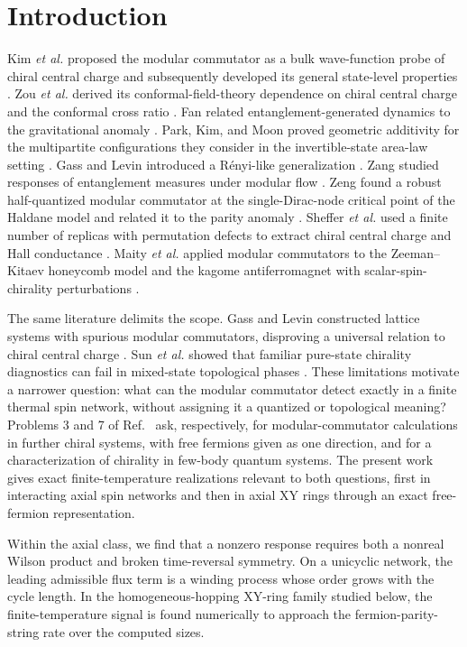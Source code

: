 \documentclass[aps,prb,preprint,nofootinbib,longbibliography]{revtex4-2}
\begin{document}
\section{Introduction}
\label{sec:introduction}

Kim \textit{et al.} proposed the modular commutator as a bulk wave-function
probe of chiral central charge \cite{KimEtAl2022PRL} and subsequently
developed its general state-level properties \cite{KimEtAl2022PRB}.  Zou
\textit{et al.} derived its conformal-field-theory dependence on chiral
central charge and the conformal cross ratio \cite{ZouEtAl2022}.  Fan related
entanglement-generated dynamics to the gravitational anomaly
\cite{Fan2022}.  Park, Kim, and Moon proved geometric additivity for the
multipartite configurations they consider in the invertible-state area-law
setting \cite{ParkEtAl2025}.  Gass and Levin introduced
a R\'enyi-like generalization \cite{GassLevin2026}.  Zang studied responses of
entanglement measures under modular flow \cite{Zang2026}.  Zeng found a
robust half-quantized modular commutator at the single-Dirac-node critical
point of the Haldane model and related it to the parity anomaly
\cite{Zeng2026}.  Sheffer
\textit{et al.} used a finite number of replicas with permutation defects to
extract chiral central charge and Hall conductance \cite{ShefferEtAl2026}.
Maity \textit{et al.} applied modular commutators to the Zeeman--Kitaev
honeycomb model and the kagome antiferromagnet with scalar-spin-chirality
perturbations \cite{MaityEtAl2025}.

The same literature delimits the scope.  Gass and Levin constructed lattice
systems with spurious modular commutators, disproving a universal relation to
chiral central charge \cite{GassLevin2024}.  Sun \textit{et al.} showed that
familiar pure-state chirality diagnostics can fail in mixed-state topological
phases \cite{SunEtAl2026}.  These limitations motivate a
narrower question: what can the modular commutator detect exactly in a finite
thermal spin network, without assigning it a quantized or topological
meaning?  Problems 3 and 7 of Ref.~\cite{KimEtAl2022PRB} ask, respectively,
for modular-commutator calculations in further chiral systems, with free
fermions given as one direction, and for a characterization of chirality in
few-body quantum systems.  The present work gives exact finite-temperature
realizations relevant to both questions, first in interacting axial spin
networks and then in axial XY rings through an exact free-fermion
representation.

Within the axial class, we find that a nonzero response requires both a
nonreal Wilson product and broken time-reversal symmetry.  On a unicyclic
network, the leading admissible flux term is a winding process whose order
grows with the cycle length.  In the homogeneous-hopping XY-ring family
studied below, the finite-temperature signal is found numerically to approach
the fermion-parity-string rate over the computed sizes.
\end{document}
